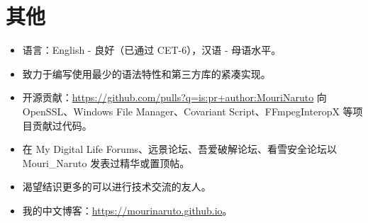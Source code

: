 \documentclass{resume}
\begin{document}
\section{其他}
\begin{itemize}

  \item 语言：English - 良好（已通过 CET-6），汉语 - 母语水平。

  \item 致力于编写使用最少的语法特性和第三方库的紧凑实现。

  \item 开源贡献：\href{https://github.com/pulls?q=is:pr+author:MouriNaruto}{https://github.com/pulls?q=is:pr+author:MouriNaruto} 向 OpenSSL、Windows File Manager、Covariant Script、FFmpegInteropX 等项目贡献过代码。
  
  \item 在 My Digital Life Forums、远景论坛、吾爱破解论坛、看雪安全论坛以 Mouri\_Naruto 发表过精华或置顶帖。
  
  \item 渴望结识更多的可以进行技术交流的友人。

  \item 我的中文博客：\href{https://mourinaruto.github.io}{https://mourinaruto.github.io}。
  
\end{itemize}
\end{document}
